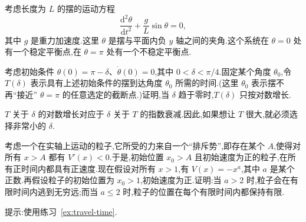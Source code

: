 \begin{exercise}\label{ex:pendulum-logarithmic-time}
考虑长度为 $L$ 的摆的运动方程
\[
  \frac{\mathrm{d}^{2}\theta}{\mathrm{d}t^{2}}+\frac{g}{L}\sin\theta=0,
\]
其中 $g$ 是重力加速度.这里 $\theta$ 是摆与平面内负 $y$ 轴之间的夹角.这个系统在 $\theta=0$ 处有一个稳定平衡点,在 $\theta=\pi$ 处有一个不稳定平衡点.

考虑初始条件 $\theta(0)=\pi-\delta$、$\dot{\theta}(0)=0$,其中 $0<\delta<\pi/4$.固定某个角度 $\theta_{0}$,令 $T(\delta)$ 表示具有上述初始条件的摆到达角度 $\theta_{0}$ 所需的时间.(这里 $\theta_{0}$ 表示摆不再“接近” $\theta=\pi$ 的任意选定的截断点.)证明,当 $\delta$ 趋于零时,$T(\delta)$ 只按对数增长.
\begin{note}
$T$ 关于 $\delta$ 的对数增长对应于 $\delta$ 关于 $T$ 的指数衰减.因此,如果想让 $T$ 很大,就必须选择非常小的 $\delta$.
\end{note}
\end{exercise}

\begin{exercise}\label{ex:repelling-potential}
考虑一个在实轴上运动的粒子,它所受的力来自一个“排斥势”,即存在某个 $A$,使得对所有 $x>A$ 都有 $V'(x)<0$.于是,初始位置 $x_{0}>A$ 且初始速度为正的粒子,在所有正时间内都具有正速度.现在假设对所有 $x>1$,有 $V(x)=-x^{a}$,其中 $a$ 是某个正数.再假设粒子的初始位置为 $x_{0}>1$,初始速度为正.证明:当 $a>2$ 时,粒子会在有限时间内逃到无穷远;而当 $a\leq2$ 时,粒子的位置在每个有限时间内都保持有限.
\begin{note}
提示:使用练习~\ref{ex:travel-time}.
\end{note}
\end{exercise}

